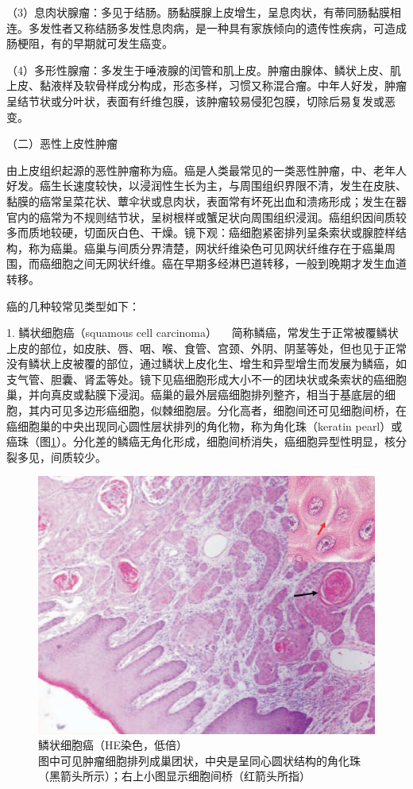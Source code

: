 （3）息肉状腺瘤：多见于结肠。肠黏膜腺上皮增生，呈息肉状，有蒂同肠黏膜相连。多发性者又称结肠多发性息肉病，是一种具有家族倾向的遗传性疾病，可造成肠梗阻，有的早期就可发生癌变。

（4）多形性腺瘤：多发生于唾液腺的闰管和肌上皮。肿瘤由腺体、鳞状上皮、肌上皮、黏液样及软骨样成分构成，形态多样，习惯又称混合瘤。中年人好发，肿瘤呈结节状或分叶状，表面有纤维包膜，该肿瘤较易侵犯包膜，切除后易复发或恶变。

{（二）恶性上皮性肿瘤}

由上皮组织起源的恶性肿瘤称为癌。癌是人类最常见的一类恶性肿瘤，中、老年人好发。癌生长速度较快，以浸润性生长为主，与周围组织界限不清，发生在皮肤、黏膜的癌常呈菜花状、蕈伞状或息肉状，表面常有坏死出血和溃疡形成；发生在器官内的癌常为不规则结节状，呈树根样或蟹足状向周围组织浸润。癌组织因间质较多而质地较硬，切面灰白色、干燥。镜下观：癌细胞紧密排列呈条索状或腺腔样结构，称为癌巢。癌巢与间质分界清楚，网状纤维染色可见网状纤维存在于癌巢周围，而癌细胞之间无网状纤维。癌在早期多经淋巴道转移，一般到晚期才发生血道转移。

癌的几种较常见类型如下：

{1. 鳞状细胞癌（squamous cell carcinoma）}
　简称鳞癌，常发生于正常被覆鳞状上皮的部位，如皮肤、唇、咽、喉、食管、宫颈、外阴、阴茎等处，但也见于正常没有鳞状上皮被覆的部位，通过鳞状上皮化生、增生和异型增生而发展为鳞癌，如支气管、胆囊、肾盂等处。镜下见癌细胞形成大小不一的团块状或条索状的癌细胞巢，并向真皮或黏膜下浸润。癌巢的最外层癌细胞排列整齐，相当于基底层的细胞，其内可见多边形癌细胞，似棘细胞层。分化高者，细胞间还可见细胞间桥，在癌细胞巢的中央出现同心圆性层状排列的角化物，称为角化珠（keratin
pearl）或癌珠（图\ref{fig5-14}）。分化差的鳞癌无角化形成，细胞间桥消失，癌细胞异型性明显，核分裂多见，间质较少。

\begin{figure}[!htbp]
 \centering
 \includegraphics{./images/Image00082.jpg}
 \captionsetup{justification=centering}
 \caption{鳞状细胞癌（HE染色，低倍）\\{\small 图中可见肿瘤细胞排列成巢团状，中央是呈同心圆状结构的角化珠（黑箭头所示）；右上小图显示细胞间桥（红箭头所指）}}
 \label{fig5-14}
  \end{figure}



